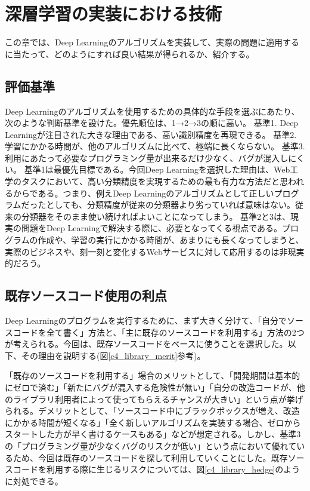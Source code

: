 \chapter{深層学習の実装における技術}
この章では、Deep Learningのアルゴリズムを実装して、実際の問題に適用するに当たって、どのようにすれば良い結果が得られるか、紹介する。
\section{評価基準}
Deep Learningのアルゴリズムを使用するための具体的な手段を選ぶにあたり、次のような判断基準を設けた。優先順位は、1→2→3の順に高い。
基準1. Deep Learningが注目された大きな理由である、高い識別精度を再現できる。
基準2. 学習にかかる時間が、他のアルゴリズムに比べて、極端に長くならない。
基準3. 利用にあたって必要なプログラミング量が出来るだけ少なく、バグが混入しにくい。
基準1は最優先目標である。今回Deep Learningを選択した理由は、Web工学のタスクにおいて、高い分類精度を実現するための最も有力な方法だと思われるからである。つまり、例えDeep Learningのアルゴリズムとして正しいプログラムだったとしても、分類精度が従来の分類器より劣っていれば意味はない。従来の分類器をそのまま使い続ければよいことになってしまう。
基準2と3は、現実の問題をDeep Learningで解決する際に、必要となってくる視点である。プログラムの作成や、学習の実行にかかる時間が、あまりにも長くなってしまうと、実際のビジネスや、刻一刻と変化するWebサービスに対して応用するのは非現実的だろう。
\section{既存ソースコード使用の利点}
Deep Learningのプログラムを実行するために、まず大きく分けて、「自分でソースコードを全て書く」方法と、「主に既存のソースコードを利用する」方法の2つが考えられる。今回は、既存ソースコードをベースに使うことを選択した。以下、その理由を説明する(図\ref{c4_library_merit}参考)。\par
「既存のソースコードを利用する」場合のメリットとして、「開発期間は基本的にゼロで済む」「新たにバグが混入する危険性が無い」「自分の改造コードが、他のライブラリ利用者によって使ってもらえるチャンスが大きい」という点が挙げられる。デメリットとして、「ソースコード中にブラックボックスが増え、改造にかかる時間が短くなる」「全く新しいアルゴリズムを実装する場合、ゼロからスタートした方が早く書けるケースもある」などが想定される。しかし、基準3の「プログラミング量が少なくバグのリスクが低い」という点において優れているため、今回は既存のソースコードを探して利用していくことにした。既存ソースコードを利用する際に生じるリスクについては、図\ref{c4_library_hedge}のように対処できる。\par

